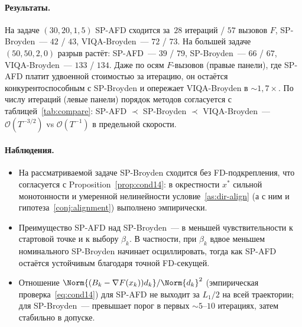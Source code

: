 \paragraph{Результаты.} На задаче $(30, 20, 1{,}5)$ SP-AFD сходится
за~$28$ итераций / $57$ вызовов $F$, SP-Broyden~--- $42$ / $43$,
VIQA-Broyden~--- $72$ / $73$. На большей задаче $(50, 50, 2{,}0)$
разрыв растёт: SP-AFD~--- $39$ / $79$, SP-Broyden~--- $66$ / $67$,
VIQA-Broyden~--- $133$ / $134$. Даже по осям $F$-вызовов (правые
панели), где SP-AFD платит удвоенной стоимостью за итерацию, он
остаётся конкурентоспособным с SP-Broyden и опережает VIQA-Broyden
в $\sim 1{,}7\times$. По числу итераций (левые панели) порядок
методов согласуется с таблицей~\ref{tab:compare}:
SP-AFD $\prec$ SP-Broyden $\prec$ VIQA-Broyden~---
$\mathcal O(T^{-3/2})$ vs $\mathcal O(T^{-1})$ в предельной скорости.

\paragraph{Наблюдения.}
\begin{itemize}
\item На рассматриваемой задаче SP-Broyden сходится без FD-подкрепления,
      что согласуется с Proposition~\ref{prop:cond14}:
      в окрестности $x^{*}$ сильной монотонности и умеренной нелинейности
      условие~\ref{as:dir-align} (а с ним и
      гипотеза~\ref{conj:alignment}) выполнено эмпирически.
\item Преимущество SP-AFD над SP-Broyden~--- в меньшей чувствительности
      к стартовой точке и к выбору $\beta_k$. В частности, при
      $\beta_k$ вдвое меньшем номинального SP-Broyden начинает
      осциллировать, тогда как SP-AFD остаётся устойчивым благодаря
      точной FD-секущей.
\item Отношение $\Norm{(B_k - \nabla F(x_k)) d_k} / \Norm{d_k}^2$
      (эмпирическая проверка~\eqref{eq:cond14}) для SP-AFD не выходит
      за $L_1/2$ на всей траектории; для SP-Broyden~--- превышает порог
      в первых $\sim 5$--$10$ итерациях, затем стабильно в допуске.
\end{itemize}

